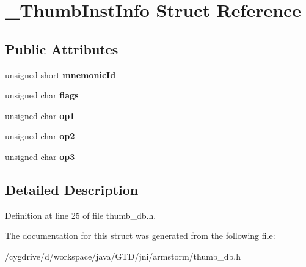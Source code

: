 \hypertarget{struct__ThumbInstInfo}{\section{\-\_\-\-Thumb\-Inst\-Info Struct Reference}
\label{struct__ThumbInstInfo}
}
\subsection*{Public Attributes}
\begin{DoxyCompactItemize}
\item 
\hypertarget{struct__ThumbInstInfo_a29bcf90f01278432a76576ac0a977479}{unsigned short {\bfseries mnemonic\-Id}}\label{struct__ThumbInstInfo_a29bcf90f01278432a76576ac0a977479}

\item 
\hypertarget{struct__ThumbInstInfo_a749b286b99305a2b39db13cf1478fc44}{unsigned char {\bfseries flags}}\label{struct__ThumbInstInfo_a749b286b99305a2b39db13cf1478fc44}

\item 
\hypertarget{struct__ThumbInstInfo_a56911778768a5cf6c125bff17e768a96}{unsigned char {\bfseries op1}}\label{struct__ThumbInstInfo_a56911778768a5cf6c125bff17e768a96}

\item 
\hypertarget{struct__ThumbInstInfo_a6cb4b102f19d4820e7b043c0765a3860}{unsigned char {\bfseries op2}}\label{struct__ThumbInstInfo_a6cb4b102f19d4820e7b043c0765a3860}

\item 
\hypertarget{struct__ThumbInstInfo_acfd31f4e3620bde158d3f51a484a0841}{unsigned char {\bfseries op3}}\label{struct__ThumbInstInfo_acfd31f4e3620bde158d3f51a484a0841}

\end{DoxyCompactItemize}


\subsection{Detailed Description}


Definition at line 25 of file thumb\-\_\-db.\-h.



The documentation for this struct was generated from the following file\-:\begin{DoxyCompactItemize}
\item 
/cygdrive/d/workspace/java/\-G\-T\-D/jni/armstorm/thumb\-\_\-db.\-h\end{DoxyCompactItemize}
